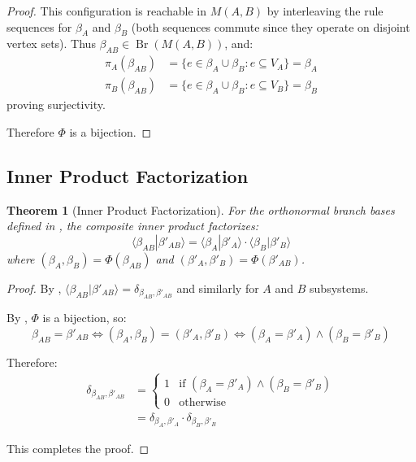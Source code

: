 \documentclass[11pt,a4paper]{article}
\newtheorem{theorem}{Theorem}[section]
\theoremstyle{definition}
\theoremstyle{remark}
\DeclareMathOperator{\Br}{Br}
\newcommand{\braket}[2]{\langle#1|#2\rangle}
\begin{document}
\begin{proof}
This configuration is reachable in $M(A,B)$ by interleaving the rule sequences for $\beta_A$ and $\beta_B$ (both sequences commute since they operate on disjoint vertex sets). Thus $\beta_{AB} \in \Br(M(A,B))$, and:
\begin{align}
\pi_A(\beta_{AB}) &= \{e \in \beta_A \cup \beta_B : e \subseteq V_A\} = \beta_A \\
\pi_B(\beta_{AB}) &= \{e \in \beta_A \cup \beta_B : e \subseteq V_B\} = \beta_B
\end{align}
proving surjectivity.

Therefore $\Phi$ is a bijection.
\end{proof}

\subsection{Inner Product Factorization}

\begin{theorem}[Inner Product Factorization]
\label{thm:inner_product_factorization}
For the orthonormal branch bases defined in , the composite inner product factorizes:
\begin{equation}
\braket{\beta_{AB}}{\beta'_{AB}} = \braket{\beta_A}{\beta'_A} \cdot \braket{\beta_B}{\beta'_B}
\end{equation}
where $(\beta_A, \beta_B) = \Phi(\beta_{AB})$ and $(\beta'_A, \beta'_B) = \Phi(\beta'_{AB})$.
\end{theorem}

\begin{proof}
By , $\braket{\beta_{AB}}{\beta'_{AB}} = \delta_{\beta_{AB}, \beta'_{AB}}$ and similarly for $A$ and $B$ subsystems.

By , $\Phi$ is a bijection, so:
\begin{equation}
\beta_{AB} = \beta'_{AB} \iff (\beta_A, \beta_B) = (\beta'_A, \beta'_B) \iff (\beta_A = \beta'_A) \land (\beta_B = \beta'_B)
\end{equation}

Therefore:
\begin{align}
\delta_{\beta_{AB}, \beta'_{AB}} &=
\begin{cases}
1 & \text{if } (\beta_A = \beta'_A) \land (\beta_B = \beta'_B) \\
0 & \text{otherwise}
\end{cases} \\
&= \delta_{\beta_A, \beta'_A} \cdot \delta_{\beta_B, \beta'_B}
\end{align}

This completes the proof.
\end{proof}
\end{document}
